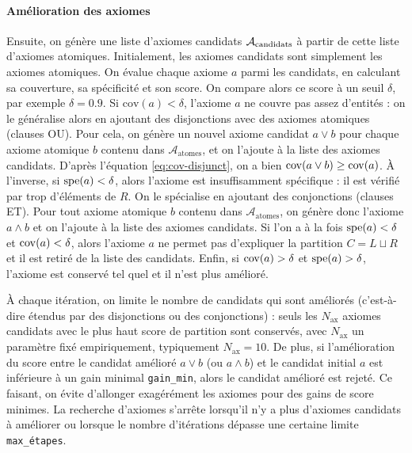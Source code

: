 \paragraph{Amélioration des axiomes}

Ensuite, on génère une liste d'axiomes candidats $\cal{A}_\text{candidats}$ à partir de cette liste d'axiomes atomiques. Initialement, les axiomes candidats sont simplement les axiomes atomiques. On évalue chaque axiome $a$ parmi les candidats, en calculant sa couverture, sa spécificité et son score. On compare alors ce score à un seuil $\delta$, par exemple $\delta = 0.9$. Si $\text{cov}(a) < \delta$, l'axiome $a$ ne couvre pas assez d'entités : on le généralise alors en ajoutant des disjonctions avec des axiomes atomiques (clauses OU). %
Pour cela, on génère un nouvel axiome candidat $a \lor b$ pour chaque axiome atomique $b$ contenu dans $\mathcal{A}_\text{atomes}$, 
et on l'ajoute à la liste des axiomes candidats. D'après l'équation \ref{eq:cov-disjunct}, on a bien $\cov(a \lor b) \geq \cov(a)$.
À l'inverse, si $\spe(a) < \delta$, alors l'axiome est insuffisamment spécifique : il est vérifié par trop d'éléments de $R$. 
On le spécialise en ajoutant des conjonctions (clauses ET).
Pour tout axiome atomique $b$ contenu dans $\mathcal{A}_\text{atomes}$, on génère donc l'axiome $a \land b$ et on l'ajoute à la liste des axiomes candidats. 
Si l'on a à la fois $\spe(a) < \delta$ et $\cov(a) < \delta$, alors l'axiome $a$ ne permet pas d'expliquer la partition $C = L \sqcup R$ et il est retiré de la liste des candidats. Enfin, si $\cov(a) > \delta$ et $\spe(a) > \delta$, l'axiome est conservé tel quel et il n'est plus amélioré.

À chaque itération, on limite le nombre de candidats qui sont améliorés (c'est-à-dire étendus par des disjonctions ou des conjonctions) : seuls les $N_\text{ax}$ axiomes candidats avec le plus haut score de partition sont conservés, avec $N_\text{ax}$ un paramètre fixé empiriquement, typiquement $N_\text{ax} = 10$. 
De plus, si l'amélioration du score entre le candidat amélioré $a \lor b$ (ou $a \land b$) et le candidat initial $a$ est inférieure à un gain minimal \texttt{gain\_min}, alors le candidat amélioré est rejeté. Ce faisant, on évite d'allonger exagérément les axiomes pour des gains de score minimes.
La recherche d'axiomes s'arrête lorsqu'il n'y a plus d'axiomes candidats à améliorer ou lorsque le nombre d'itérations dépasse une certaine limite \texttt{max\_étapes}. %

